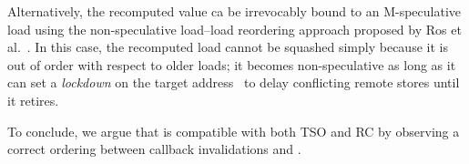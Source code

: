 Alternatively, the recomputed value ca be irrevocably bound to an M-speculative load using the non-speculative load--load reordering approach proposed by Ros et al.~\cite{aros-isca17}. In this case, the recomputed load cannot be squashed simply because it is out of order with respect to older loads; it becomes non-speculative as long as it can set a \emph{lockdown} on the target address~\cite{aros-isca17} to delay conflicting remote stores until it retires.

To conclude, we argue that {\recomp} is compatible with both TSO and RC by observing a correct ordering between callback invalidations and {\recomp}.



%
%
%
%
%
%
%
%

